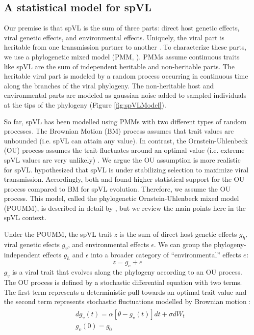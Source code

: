 \documentclass[]{article}
\begin{document}
\begin{doublespace}
\subsection{A statistical model for spVL}

Our premise is that spVL is the sum of three parts: direct host genetic effects, viral genetic effects, and environmental effects. Uniquely, the viral part is heritable from one transmission partner to another \parencite{Mitov2018, Bertels2018}. To characterize these parts, we use a phylogenetic mixed model (PMM, \cite{Housworth2004}). PMMs assume continuous traits like spVL are the sum of independent heritable and non-heritable parts. The heritable viral part is modeled by a random process occurring in continuous time along the branches of the viral phylogeny. The non-heritable host and environmental parts are modeled as gaussian noise added to sampled individuals at the tips of the phylogeny (Figure \ref{fig:spVLModel}).

So far, spVL has been modelled using PMMs with two different types of random processes. The Brownian Motion (BM) process assumes that trait values are unbounded (i.e. spVL can attain any value). In contrast, the Ornstein-Uhlenbeck (OU) process assumes the trait fluctuates around an optimal value (i.e. extreme spVL values are very unlikely) \cite{Butler2004}. We argue the OU assumption is more realistic for spVL. \citet{Fraser2014} hypothesized that spVL is under stabilizing selection to maximize viral transmission. Accordingly, both \citet{Mitov2018} and \citet{Bertels2018} found higher statistical support for the OU process compared to BM for spVL evolution. Therefore, we assume the OU process. This model, called the phylogenetic Ornstein-Uhlenbeck mixed model (POUMM), is described in detail by \citet{Mitov2018}, but we review the main points here in the spVL context.

Under the POUMM, the spVL trait $z$ is the sum of direct host genetic effects $g_h$, viral genetic efects $g_v$, and environmental effects $\epsilon$. We can group the phylogeny-independent effects $g_h$ and $\epsilon$ into a broader category of ``environmental'' effects $e$: 
\begin{equation}
    z = g_{v} + e
\end{equation}
$g_v$ is a viral trait that evolves along the phylogeny according to an OU process. The OU process is defined by a stochastic differential equation with two terms. The first term represents a deterministic pull towards an optimal trait value and the second term represents stochastic fluctuations modelled by Brownian motion \cite{Butler2004}:
\begin{align}
\begin{split}
	&dg_v(t) = \alpha[\theta - g_v(t)]dt + \sigma dW_t \\
	&g_v(0) = g_0 
	\label{eq:OUprocess}
\end{split}
\end{align}


\end{doublespace}
\end{document}
